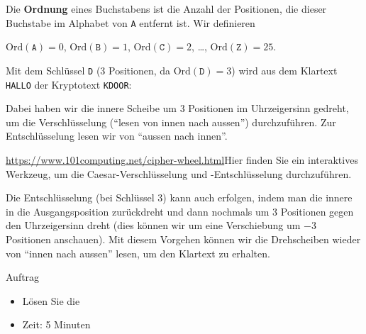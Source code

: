 \begin{frame}
    \begin{mydefinition}\label{mydefinition:ordnung_buchstabe}
        Die \textbf{Ordnung} eines Buchstabens ist die Anzahl der Positionen, die dieser Buchstabe im Alphabet von \texttt{A} entfernt ist. Wir definieren
        \begin{center}
            $\text{Ord}(\texttt{A}) = 0$, $\text{Ord}(\texttt{B}) = 1$, $\text{Ord}(\texttt{C}) = 2$, \dots, $\text{Ord}(\texttt{Z}) = 25$.
        \end{center}
    \end{mydefinition}
\end{frame}


\begin{frame}\leavevmode
    \begin{myexample}
    Mit dem Schlüssel \texttt{D} (3 Positionen, da $\text{Ord}(\texttt{D}) = 3$) wird aus dem Klartext \texttt{HALLO} der Kryptotext \texttt{KDOOR}:
    \begin{figure}[H]
        \centering
        \centering\scalebox{.6}{\caesar[3]}
        \label{fig:caesar_3}
    \end{figure}
    Dabei haben wir die innere Scheibe um 3 Positionen im Uhrzeigersinn gedreht, um die Verschlüsselung (\enquote{lesen von innen nach aussen}) durchzuführen. 
    Zur Entschlüsselung lesen wir von \enquote{aussen nach innen}.
    \end{myexample}
\end{frame}


\begin{frame}
\url{https://www.101computing.net/cipher-wheel.html}{Hier} finden Sie ein interaktives Werkzeug, um die Caesar-Verschlüsselung und -Entschlüsselung durchzuführen.

\vspace{0.5cm}
Die Entschlüsselung (bei Schlüssel 3) kann auch erfolgen, indem man die innere in die Ausgangsposition zurückdreht und dann nochmals um 3 Positionen gegen den Uhrzeigersinn dreht (dies können wir um eine Verschiebung um $-3$ Positionen anschauen). Mit diesem Vorgehen können wir die Drehscheiben wieder von \enquote{innen nach aussen} lesen, um den Klartext zu erhalten.
\end{frame}

\begin{frame}{Auftrag}
    \begin{itemize}
        \item Lösen Sie die 
        \item Zeit: 5 Minuten
    \end{itemize}
\end{frame}


